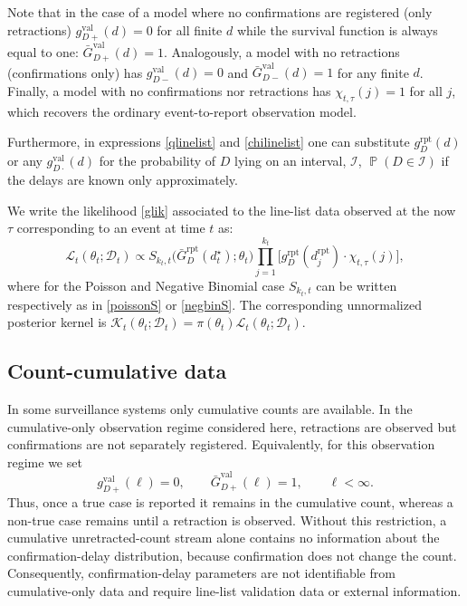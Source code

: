\documentclass{article}
\theoremstyle{definition}
\theoremstyle{remark}
\newcommand{\Prb}{\operatorname{\mathbb{P}}}
\begin{document}
Note that in the case of a model where no confirmations are registered (only retractions) $g_{D+}^{\text{val}}(d) = 0$ for all finite $d$ while the survival function is always equal to one: $\bar{G}_{D+}^{\text{val}}(d) = 1$. Analogously, a model with no retractions (confirmations only) has $g_{D-}^{\text{val}}(d) = 0$ and $\bar{G}_{D-}^{\text{val}}(d) = 1$ for any finite $d$. Finally, a model with no confirmations nor retractions has $\chi_{t,\tau}(j) = 1$ for all $j$, which recovers the ordinary event-to-report observation model. 

Furthermore, in expressions \eqref{qlinelist} and \eqref{chilinelist} one can substitute $g_{D}^{\text{rpt}}(d)$ or any $g_{D\cdot}^{\text{val}}(d)$ for the probability of $D$ lying on an interval, $\mathcal{I}$, $\Prb(D \in \mathcal{I})$ if the delays are known only approximately. 

We write the likelihood \eqref{glik} associated to the line-list data observed at the now $\tau$ corresponding to an event at time $t$ as:
\begin{equation}\label{linelist}  
    \mathcal{L}_t(\theta_t;\mathcal D_t) 
    \propto 
    S_{k_t,t}\big(\bar{G}_{D}^{\text{rpt}}(d_t^{\star});\theta_t\big) 
    \prod\limits_{j = 1}^{k_t} 
    \big[ g_{D}^{\text{rpt}} (d^{\text{rpt}}_j)  \cdot \chi_{t,\tau}(j)\big],
\end{equation}
where for the Poisson and Negative Binomial case $S_{k_t,t}$ can be written respectively as in \eqref{poissonS} or \eqref{negbinS}. The corresponding unnormalized posterior kernel is $\mathcal K_t(\theta_t;\mathcal D_t)=\pi(\theta_t)\mathcal L_t(\theta_t;\mathcal D_t)$.


\subsection{Count-cumulative data}

In some surveillance systems only cumulative counts are available. In the cumulative-only observation regime considered here, retractions are observed but confirmations are not separately registered. Equivalently, for this observation regime we set
\begin{equation}\label{noconfirmcum}
    g_{D+}^{\mathrm{val}}(\ell)=0,
    \qquad
    \bar G_{D+}^{\mathrm{val}}(\ell)=1,
    \qquad \ell<\infty.
\end{equation}
Thus, once a true case is reported it remains in the cumulative count, whereas a non-true case remains until a retraction is observed. Without this restriction, a cumulative unretracted-count stream alone contains no information about the confirmation-delay distribution, because confirmation does not change the count. Consequently, confirmation-delay parameters are not identifiable from cumulative-only data and require line-list validation data or external information.
\end{document}

